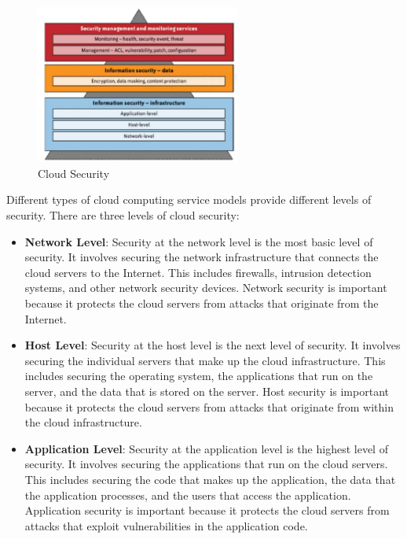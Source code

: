 \begin{figure}[H]
    \centering
    \includegraphics[width=0.6\textwidth]{assets/fig49.png}
    \caption{Cloud Security}
\end{figure}

Different types of cloud computing service models provide different levels of security. There are three levels of cloud security:
\begin{itemize}
    \item \textbf{Network Level}: Security at the network level is the most basic level of security. It involves securing the network infrastructure that connects the cloud servers to the Internet. This includes firewalls, intrusion detection systems, and other network security devices. Network security is important because it protects the cloud servers from attacks that originate from the Internet.
    \item \textbf{Host Level}: Security at the host level is the next level of security. It involves securing the individual servers that make up the cloud infrastructure. This includes securing the operating system, the applications that run on the server, and the data that is stored on the server. Host security is important because it protects the cloud servers from attacks that originate from within the cloud infrastructure.
    \item \textbf{Application Level}: Security at the application level is the highest level of security. It involves securing the applications that run on the cloud servers. This includes securing the code that makes up the application, the data that the application processes, and the users that access the application. Application security is important because it protects the cloud servers from attacks that exploit vulnerabilities in the application code.
\end{itemize}

